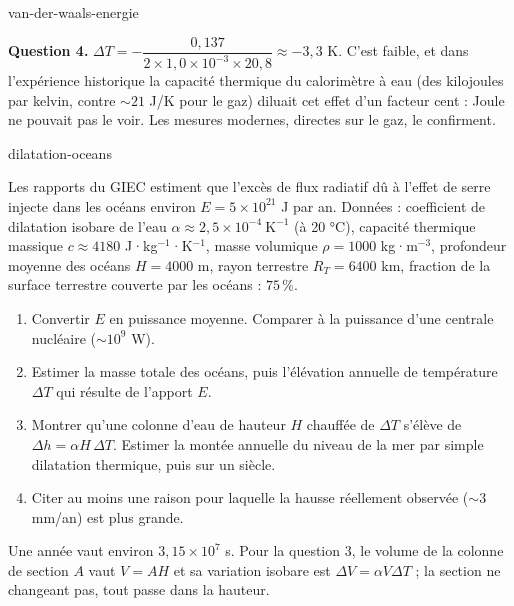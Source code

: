 \begin{exo}{van-der-waals-energie}
\begin{solution}
\textbf{Question 4.} $\Delta T = -\dfrac{0{,}137}{2\times1{,}0\times10^{-3}\times20{,}8} \approx -3{,}3$ K. C'est faible, et dans l'expérience historique la capacité thermique du calorimètre à eau (des kilojoules par kelvin, contre $\sim21$ J/K pour le gaz) diluait cet effet d'un facteur cent : Joule ne pouvait pas le voir. Les mesures modernes, directes sur le gaz, le confirment.
\end{solution}
\end{exo}

\begin{exo}{dilatation-oceans}

Les rapports du GIEC estiment que l'excès de flux radiatif dû à l'effet de serre injecte dans les océans environ $E = 5\times10^{21}$ J par an. Données : coefficient de dilatation isobare de l'eau $\alpha \approx 2{,}5\times10^{-4}\ \text{K}^{-1}$ (à 20 °C), capacité thermique massique $c \approx 4180$ J·kg$^{-1}$·K$^{-1}$, masse volumique $\rho = 1000$ kg·m$^{-3}$, profondeur moyenne des océans $H = 4000$ m, rayon terrestre $R_T = 6400$ km, fraction de la surface terrestre couverte par les océans : $75\,\%$.

\begin{enumerate}
\item Convertir $E$ en puissance moyenne. Comparer à la puissance d'une centrale nucléaire ($\sim10^9$ W).
\item Estimer la masse totale des océans, puis l'élévation annuelle de température $\Delta T$ qui résulte de l'apport $E$.
\item Montrer qu'une colonne d'eau de hauteur $H$ chauffée de $\Delta T$ s'élève de $\Delta h = \alpha H\,\Delta T$. Estimer la montée annuelle du niveau de la mer par simple dilatation thermique, puis sur un siècle.
\item Citer au moins une raison pour laquelle la hausse réellement observée ($\sim3$ mm/an) est plus grande.
\end{enumerate}

\begin{indication}
Une année vaut environ $3{,}15\times10^7$ s. Pour la question 3, le volume de la colonne de section $A$ vaut $V = AH$ et sa variation isobare est $\Delta V = \alpha V\Delta T$ ; la section ne changeant pas, tout passe dans la hauteur.
\end{indication}


\end{exo}
